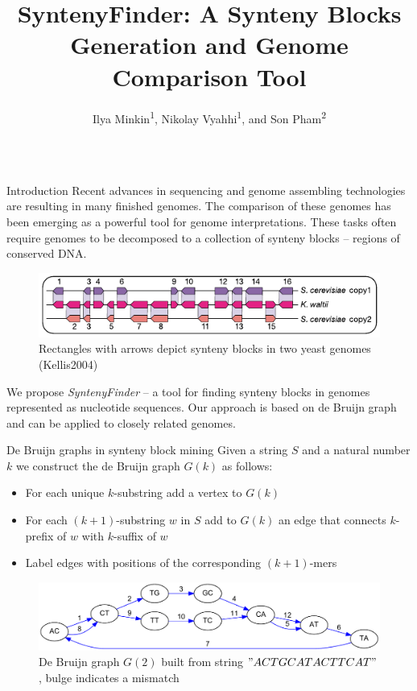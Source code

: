 \documentclass[final,hyperref={pdfpagelabels=false}]{beamer}
\title{SyntenyFinder: A Synteny Blocks Generation and Genome Comparison Tool}
\author{Ilya Minkin\textsuperscript{1}, Nikolay Vyahhi\textsuperscript{1}, and Son Pham\textsuperscript{2}}
\institute{\textsuperscript{1} St. Petersburg Academic University, St. Petersburg, Russia \\ \textsuperscript{2} University of California, San Diego, USA}
\begin{document}
\begin{frame}{}

\begin{columns}[t]

\begin{column}{0.32\linewidth}

\begin{block}{Introduction} \justifying
Recent advances in sequencing and genome assembling technologies are resulting in many finished genomes.
The comparison of these genomes has been emerging as a powerful tool for genome interpretations.
These tasks often require genomes to be  decomposed to a collection of synteny blocks -- regions of conserved DNA.
\begin{figure}
	\centering
	\includegraphics[scale = 2.8]{syntenyBlocks.pdf}
	\small \caption{Rectangles with arrows depict synteny blocks in two yeast genomes (Kellis2004)}
\end{figure}
We propose \textit{SyntenyFinder} -- a tool for finding synteny blocks in genomes represented as nucleotide sequences.
Our approach is based on de Bruijn graph and can be applied to closely related genomes.
\end{block}

\begin{block}{De Bruijn graphs in synteny block mining} \justifying
Given a string \(S\) and a natural number \(k\) we construct the de Bruijn graph \(G(k)\) as follows:

\begin{itemize}
\item For each unique \(k\)-substring add a vertex to \(G(k)\)
\item For each \((k + 1)\)-substring \(w\) in \(S\) add to \(G(k)\) an edge that connects \(k\)-prefix of \(w\) with \(k\)-suffix of \(w\)
\item Label edges with positions of the corresponding \((k + 1)\)-mers
\end{itemize}

\begin{figure}
	\centering
	\includegraphics[scale = 0.9]{simpleGraph.pdf}
	\small \caption{De Bruijn graph \(G(2)\) built from string \("ACTGCATACTTCAT"\), bulge indicates a mismatch}
\end{figure}             


\end{block}
\end{column}
\end{columns}
\end{frame}
\end{document}
